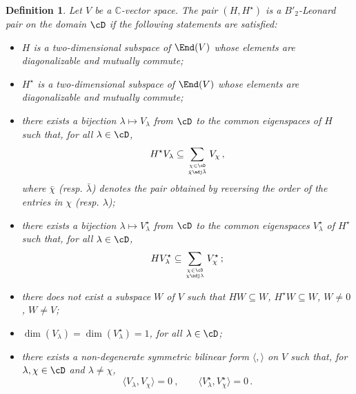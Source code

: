 \documentclass[11pt]{amsart}
\numberwithin{equation}{section}
\newtheorem{defi}[thm]{Definition}
\numberwithin{equation}{section}
\begin{document}
\begin{defi}\label{def:IT}
Let $V$ be a $\mathbb{C}$-vector space.
The pair $(H,H^\star)$ is a $B'_2$-Leonard pair on the domain $\cD$ if the following statements are satisfied:
\begin{itemize}
 \item[(i)] $H$ is a two-dimensional  subspace of $\End(V)$ whose elements are diagonalizable and mutually commute;
 \item[(ii)] $H^\star$ is a two-dimensional  subspace of $\End(V)$ whose elements are diagonalizable and mutually commute;
 \item[(iii)] there exists a bijection $\lambda\mapsto V_\lambda$  from $\cD$ to the common eigenspaces of $H$ such that, for all $\lambda\in \cD$,
 \begin{equation}\label{eq:HsV}
  H^\star V_\lambda \subseteq \sum_{ \genfrac{}{}{0pt}{}{\chi \in \cD}{\bar \chi \adj   \bar \lambda}} V_\chi\,,
 \end{equation}
 where $\bar \chi$ (resp. $\bar \lambda$) denotes the pair obtained by reversing the order of the entries in $ \chi$ (resp. $ \lambda$);
 \item[(iv)]  there exists a bijection $\lambda\mapsto V^\star_\lambda$  from $\cD$ to the common eigenspaces $V^\star_\lambda$ of $H^\star$ such that, for all $\lambda\in \cD$,
 \begin{equation}\label{eq:HVs}
  H V^\star_\lambda \subseteq \sum_{ \genfrac{}{}{0pt}{}{\chi \in \cD}{\chi \adj   \lambda}} V^\star_\chi\,;
 \end{equation}
 \item[(v)] there does not exist a subspace $W$ of $V$ such that $HW\subseteq W$, $H^\star W\subseteq W$, $W\neq 0$, $W\neq V$;
 \item[(vi)] $\dim(V_\lambda)=\dim(V^\star_\lambda)=1$, for all  $\lambda\in \cD$;
 \item[(vii)] there exists a non-degenerate symmetric bilinear form  $\langle,\rangle$ on $V$ such that, for $\lambda,\chi\in \cD$ and $\lambda\neq \chi$,
 \begin{equation}
\langle V_\lambda, V_\chi\rangle=0\ ,\qquad  \langle V^\star_\lambda, V^\star_\chi\rangle=0\,.
 \end{equation}
\end{itemize}
\end{defi}
\end{document}
